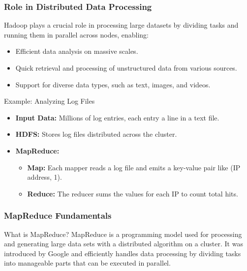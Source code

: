 \documentclass[aspectratio=169]{beamer}
\begin{document}
\begin{frame}[fragile]
    \frametitle{Role in Distributed Data Processing}
    Hadoop plays a crucial role in processing large datasets by dividing tasks and running them in parallel across nodes, enabling:
    \begin{itemize}
        \item Efficient data analysis on massive scales.
        \item Quick retrieval and processing of unstructured data from various sources.
        \item Support for diverse data types, such as text, images, and videos.
    \end{itemize}

    \begin{block}{Example: Analyzing Log Files}
    \begin{itemize}
        \item \textbf{Input Data:} Millions of log entries, each entry a line in a text file.
        \item \textbf{HDFS:} Stores log files distributed across the cluster.
        \item \textbf{MapReduce:}
            \begin{itemize}
                \item \textbf{Map:} Each mapper reads a log file and emits a key-value pair like (IP address, 1).
                \item \textbf{Reduce:} The reducer sums the values for each IP to count total hits.
            \end{itemize}
    \end{itemize}
    \end{block}
\end{frame}

\begin{frame}[fragile]
  \frametitle{MapReduce Fundamentals}
  \begin{block}{What is MapReduce?}
    MapReduce is a programming model used for processing and generating large data sets with a distributed algorithm on a cluster. It was introduced by Google and efficiently handles data processing by dividing tasks into manageable parts that can be executed in parallel.
  \end{block}
\end{frame}
\end{document}

